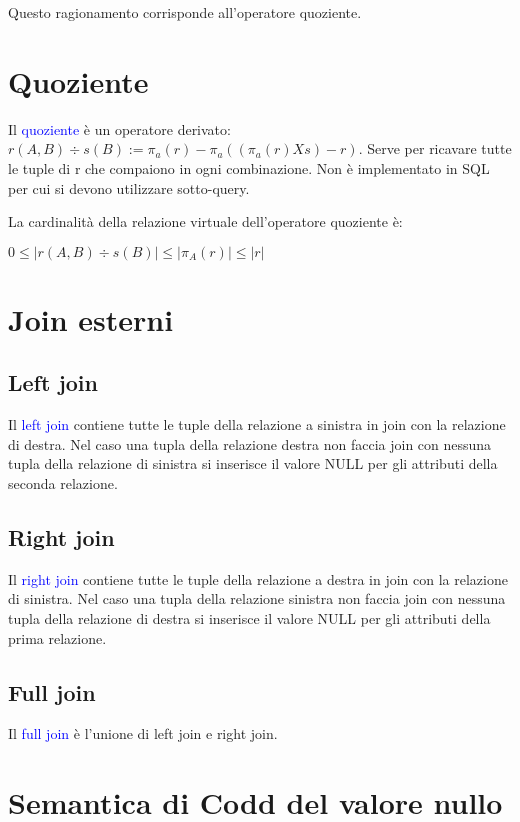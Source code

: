 Questo ragionamento corrisponde all'operatore quoziente.

\section{Quoziente}

Il \textcolor{blue}{quoziente} è un operatore derivato: $r(A, B) \div s(B) := \pi_a(r) - \pi_a((\pi_a(r) X s) - r)$.
Serve per ricavare tutte le tuple di r che compaiono in ogni combinazione. Non è implementato in SQL per cui si devono utilizzare sotto-query.

La cardinalità della relazione virtuale dell'operatore quoziente è:

$0 \leq |r(A,B) \div s(B)| \leq |\pi_A(r)| \leq |r|$

\section{Join esterni}
\label{Join e}
\subsection{Left join}

Il \textcolor{blue}{left join} contiene tutte le tuple della relazione a sinistra in join con la relazione di destra. Nel caso una tupla della relazione destra non faccia join con nessuna tupla della relazione di sinistra si inserisce il valore NULL per gli attributi della seconda relazione.

\subsection{Right join}

Il \textcolor{blue}{right join} contiene tutte le tuple della relazione a destra in join con la relazione di sinistra. Nel caso una tupla della relazione sinistra non faccia join con nessuna tupla della relazione di destra si inserisce il valore NULL per gli attributi della prima relazione.

\subsection{Full join}

Il \textcolor{blue}{full join} è l'unione di left join e right join.

\section{Semantica di Codd del valore nullo}

